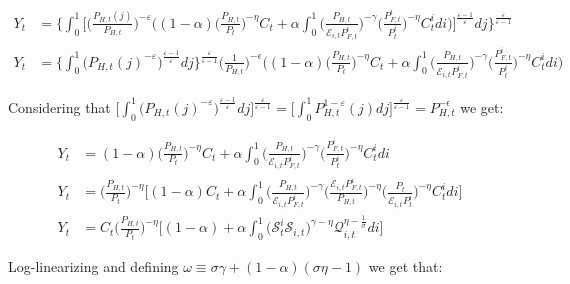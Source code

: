 \documentclass{article}
\begin{document}
\begin{equation*}
    \begin{split}
    Y_{t} &= \Bigg\{ \int^1_0 \Bigg[ \bigg( \frac{P_{H,t}(j)}{P_{H,t}} \bigg)^{-\varepsilon} \bigg((1-\alpha) \Big( \frac{P_{H,t}}{P_t} \Big)^{-\eta} C_t +  \alpha \int_0^1 \Big( \frac{P_{H,t}}{\mathcal{E}_{i,t} P^i_{F,t}} \Big)^{-\gamma} \Big( \frac{P^i_{F,t}}{P^i_{t}} \Big)^{-\eta} C^i_t di \bigg)\Bigg]^{\frac{\varepsilon-1}{\varepsilon}}dj \Bigg\}^\frac{\varepsilon}{\varepsilon-1}\\
    Y_{t} &= \Bigg\{ \int^1_0 \Big( P_{H,t}(j)^{-\varepsilon} \Big)^{\frac{\varepsilon-1}{\varepsilon}}dj \Bigg\}^\frac{\varepsilon}{\varepsilon-1} \Big(\frac{1}{P_{H,t}}\Big)^{-\epsilon} \bigg((1-\alpha) \Big( \frac{P_{H,t}}{P_t} \Big)^{-\eta} C_t +  \alpha \int_0^1 \Big( \frac{P_{H,t}}{\mathcal{E}_{i,t} P^i_{F,t}} \Big)^{-\gamma} \Big( \frac{P^i_{F,t}}{P^i_{t}} \Big)^{-\eta} C^i_t di \bigg)
    \end{split}
\end{equation*}


Considering that $\Big[ \int^1_0 \Big( P_{H,t}(j)^{-\varepsilon} \Big)^{\frac{\varepsilon-1}{\varepsilon}}dj \Big]^\frac{\varepsilon}{\varepsilon-1} = \Big[ \int^1_0 P_{H,t}^{1-\varepsilon}(j)  dj \Big]^\frac{\varepsilon}{\varepsilon-1} = P_{H,t}^{-\epsilon}$ we get:

\begin{equation*}
    \begin{split}
        Y_{t} &= (1-\alpha) \Big( \frac{P_{H,t}}{P_t} \Big)^{-\eta} C_t +  \alpha \int_0^1 \Big( \frac{P_{H,t}}{\mathcal{E}_{i,t} P^i_{F,t}} \Big)^{-\gamma} \Big( \frac{P^i_{F,t}}{P^i_{t}} \Big)^{-\eta} C^i_t di \\
        Y_{t} &= \Big( \frac{P_{H,t}}{P_t} \Big)^{-\eta} \bigg[(1-\alpha)  C_t +  \alpha \int_0^1 \Big( \frac{P_{H,t}}{\mathcal{E}_{i,t} P^i_{F,t}} \Big)^{-\gamma}  \Big( \frac{\mathcal{E}_{i,t} P^i_{F,t}}{P_{H,t}} \Big)^{-\eta} \Big(\frac{P_t}{\mathcal E_{i,t} P_t^i} \Big)^{-\eta} C^i_t di \bigg] \\
        Y_{t} &= C_t \Big( \frac{P_{H,t}}{P_t} \Big)^{-\eta} \bigg[(1-\alpha)  +  \alpha \int_0^1 \Big(\mathcal S^i_t \mathcal S_{i,t} \Big)^{\gamma - \eta} \mathcal Q^{\eta - \frac{1}{\sigma}}_{i,t} di \bigg] 
    \end{split}
\end{equation*}


Log-linearizing and defining $\omega \equiv \sigma \gamma + (1- \alpha)(\sigma \eta - 1)$ we get that:
\end{document}

